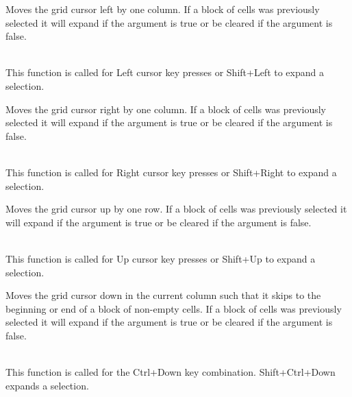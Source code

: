 \label{wxgridmovecursorleft}


Moves the grid cursor left by one column. If a block of cells was previously selected it
will expand if the argument is true or be cleared if the argument is false.

\\
This function is called for Left cursor key presses or Shift+Left to expand a selection.



\label{wxgridmovecursorright}


Moves the grid cursor right by one column. If a block of cells was previously selected it
will expand if the argument is true or be cleared if the argument is false.

\\
This function is called for Right cursor key presses or Shift+Right to expand a selection.



\label{wxgridmovecursorup}


Moves the grid cursor up by one row. If a block of cells was previously selected it
will expand if the argument is true or be cleared if the argument is false.

\\
This function is called for Up cursor key presses or Shift+Up to expand a selection.



\label{wxgridmovecursordownblock}


Moves the grid cursor down in the current column such that it skips to the beginning or
end of a block of non-empty cells. If a block of cells was previously selected it
will expand if the argument is true or be cleared if the argument is false.

\\
This function is called for the Ctrl+Down key combination. Shift+Ctrl+Down expands a selection.



